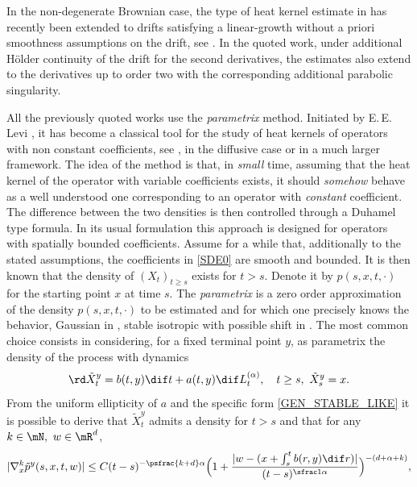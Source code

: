 In the non-degenerate Brownian case, the type of heat kernel estimate in \cite{dela:meno:10} has recently been extended to drifts satisfying a linear-growth without a priori smoothness assumptions on the drift, see \cite{meno:pesc:zhan:20}. In the quoted work, under additional Hölder continuity of the drift for the second derivatives, the estimates also extend to the derivatives up to order two with the corresponding additional parabolic singularity.

{All the previously quoted works use the \textit{parametrix} method. Initiated by E.\,E.\,Levi \cite{levi:07}, it has become a classical tool for the study of heat kernels of operators with non constant coefficients, see \eg \cite{Friedman}, \cite{mcke:sing:67} in the diffusive case or {\cite{koch:89} in a much larger framework}. The idea of the method is that, in \textit{small} time, assuming that the heat kernel of the operator with variable coefficients exists, it should \textit{somehow} behave as a well understood one corresponding to an operator with \textit{constant} coefficient. The difference between the two densities is then controlled through a Duhamel type formula.
In its usual formulation this approach is designed for operators with spatially bounded coefficients. Assume for a while that, additionally to the stated assumptions, the coefficients in \eqref{SDE0} are smooth and bounded. It is then known that the density of $(X_t)_{t\ge s}$ exists for $t>s$. Denote it by $p(s,x,t,\cdot)$ for the starting point $x$ at time $s$. The \textit{parametrix} is a zero order approximation of the density $p(s,x,t,\cdot) $ to be estimated and for which one precisely knows the behavior, \eg Gaussian in \cite{Friedman}, stable isotropic with possible shift in \cite{kolo:00}. The most common choice consists in considering, for a fixed terminal point $y$, as parametrix the density of the process with dynamics
\begin{equation}\label{PROXY_1}
\rd \tilde X_t^y=b(t,y)\dif t+a(t,y)\dif L^{(\alpha)}_t,\quad t\ge s,\ \tilde X_s^y=x.
\end{equation}
From the uniform ellipticity of $a$ and the specific form \eqref{GEN_STABLE_LIKE} it is possible to derive that
$ \tilde X_t^y$ admits a density for $t>s$ and that for any $k\in \mN,\ w\in \mR^d$,
\begin{align}\label{GRAD_BD_INTRO}
|\nabla_x^k \tilde p^y(s,x,t,w)|\le C (t-s)^{-\psfrac{k+d}\alpha}\Bigl(1+\frac{|w-(x+\int_s^t b(r,y)\dif r )|}{(t-s)^{\sfrac 1\alpha}}\Bigr)^{-(d+\alpha+k)},
\end{align}
}
